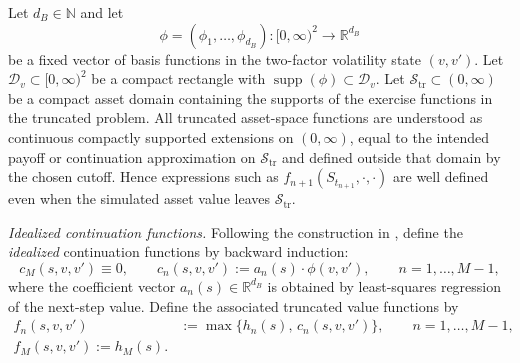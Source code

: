 \documentclass[pdflatex,sn-mathphys-num]{sn-jnl}
\theoremstyle{thmstyleone}%
\theoremstyle{thmstylethree}%
\theoremstyle{thmstyletwo}%
\providecommand{\supp}{\operatorname{supp}}
\begin{document}
Let $d_B\in\mathbb{N}$ and let
\[
\phi = (\phi_1,\dots,\phi_{d_B}) : [0,\infty)^2 \to \mathbb{R}^{d_B}
\]
be a fixed vector of basis functions in the two-factor volatility state $(v,v')$.
Let $\mathcal{D}_v\subset [0,\infty)^2$ be a compact rectangle with $\supp(\phi)\subset \mathcal{D}_v$.
Let $\mathcal S_{\mathrm{tr}}\subset(0,\infty)$ be a compact asset domain containing the supports of the
exercise functions in the truncated problem. All truncated asset-space functions are understood as continuous
compactly supported extensions on $(0,\infty)$, equal to the intended payoff or continuation approximation on
$\mathcal S_{\mathrm{tr}}$ and defined outside that domain by the chosen cutoff. Hence expressions such as
$f_{n+1}(S_{t_{n+1}},\cdot,\cdot)$ are well defined even when the simulated asset value leaves
$\mathcal S_{\mathrm{tr}}$.

\noindent\emph{Idealized continuation functions.}
Following the construction in \cite{farahany2020mixing}, define the \emph{idealized} continuation functions by backward
induction:
\[
c_M(s,v,v') \equiv 0,\qquad
c_n(s,v,v') := a_n(s)\cdot \phi(v,v'),\qquad n=1,\dots,M-1,
\]
where the coefficient vector $a_n(s)\in\mathbb{R}^{d_B}$ is obtained by least-squares regression
of the next-step value.
Define the associated truncated value functions by
\[
\begin{aligned}
f_n(s,v,v')&:= \max\{h_n(s),\,c_n(s,v,v')\},
\qquad n=1,\dots,M-1,\\
f_M(s,v,v') := h_M(s).
\end{aligned}
\]
\end{document}
